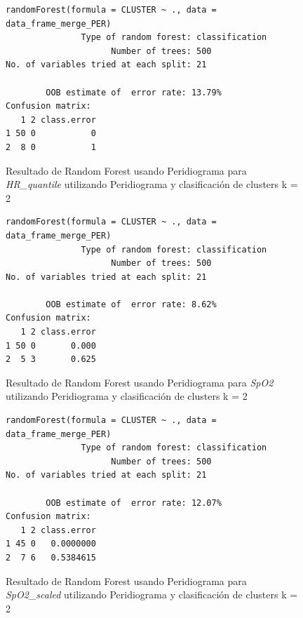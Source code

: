 \begin{figure}[H]
    \centering
    \begin{lstlisting}[frame=single, basicstyle=\small\ttfamily]
        randomForest(formula = CLUSTER ~ ., data = data_frame_merge_PER) 
               Type of random forest: classification
                     Number of trees: 500
No. of variables tried at each split: 21

        OOB estimate of  error rate: 13.79%
Confusion matrix:
   1 2 class.error
1 50 0           0
2  8 0           1
    \end{lstlisting}
    \caption{Resultado de Random Forest usando Peridiograma para \textit{HR\_quantile} utilizando Peridiograma y clasificación de clusters k = 2}
    \label{fig:random_forest_per_result_RF_3}
\end{figure}

\begin{figure}[H]
    \centering
    \begin{lstlisting}[frame=single, basicstyle=\small\ttfamily]
        randomForest(formula = CLUSTER ~ ., data = data_frame_merge_PER) 
               Type of random forest: classification
                     Number of trees: 500
No. of variables tried at each split: 21

        OOB estimate of  error rate: 8.62%
Confusion matrix:
   1 2 class.error
1 50 0       0.000
2  5 3       0.625
    \end{lstlisting}
    \caption{Resultado de Random Forest usando Peridiograma para \textit{SpO2} utilizando Peridiograma y clasificación de clusters k = 2}\label{fig:random_forest_per_result_RF_4}
\end{figure}
\begin{figure}[H]
    \centering
    \begin{lstlisting}[frame=single, basicstyle=\small\ttfamily]
        randomForest(formula = CLUSTER ~ ., data = data_frame_merge_PER) 
               Type of random forest: classification
                     Number of trees: 500
No. of variables tried at each split: 21

        OOB estimate of  error rate: 12.07%
Confusion matrix:
   1 2 class.error
1 45 0   0.0000000
2  7 6   0.5384615
    \end{lstlisting}
    \caption{Resultado de Random Forest usando Peridiograma para \textit{SpO2\_scaled} utilizando Peridiograma y clasificación de clusters k = 2}
    \label{fig:random_forest_per_result_RF_5}
\end{figure}

